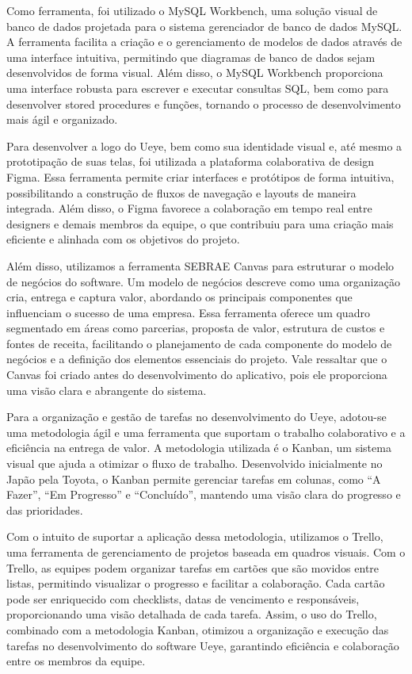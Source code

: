 Como ferramenta, foi utilizado o MySQL Workbench, uma solução visual de banco de dados projetada para o sistema gerenciador de banco de dados MySQL. A ferramenta facilita a criação e o gerenciamento de modelos de dados através de uma interface intuitiva, permitindo que diagramas de banco de dados sejam desenvolvidos de forma visual. Além disso, o MySQL Workbench proporciona uma interface robusta para escrever e executar consultas SQL, bem como para desenvolver stored procedures e funções, tornando o processo de desenvolvimento mais ágil e organizado. \textcite{DNC}

Para desenvolver a logo do Ueye, bem como sua identidade visual e, até mesmo a prototipação de suas telas, foi utilizada a plataforma colaborativa de design Figma. Essa ferramenta permite criar interfaces e protótipos de forma intuitiva, possibilitando a construção de fluxos de navegação e layouts de maneira integrada. Além disso, o Figma favorece a colaboração em tempo real entre designers e demais membros da equipe, o que contribuiu para uma criação mais eficiente e alinhada com os objetivos do projeto.  \textcite{Alura}

Além disso, utilizamos a ferramenta SEBRAE Canvas para estruturar o modelo de negócios do software. Um modelo de negócios descreve como uma organização cria, entrega e captura valor, abordando os principais componentes que influenciam o sucesso de uma empresa. Essa ferramenta oferece um quadro segmentado em áreas como parcerias, proposta de valor, estrutura de custos e fontes de receita, facilitando o planejamento de cada componente do modelo de negócios e a definição dos elementos essenciais do projeto. Vale ressaltar que o Canvas foi criado antes do desenvolvimento do aplicativo, pois ele proporciona uma visão clara e abrangente do sistema.

Para a organização e gestão de tarefas no desenvolvimento do Ueye, adotou-se uma metodologia ágil e uma ferramenta que suportam o trabalho colaborativo e a eficiência na entrega de valor. A metodologia utilizada é o Kanban, um sistema visual que ajuda a otimizar o fluxo de trabalho. Desenvolvido inicialmente no Japão pela Toyota, o Kanban permite gerenciar tarefas em colunas, como “A Fazer”, “Em Progresso” e “Concluído”, mantendo uma visão clara do progresso e das prioridades. \textcite{TOTVS}

Com o intuito de suportar a aplicação dessa metodologia, utilizamos o Trello, uma ferramenta de gerenciamento de projetos baseada em quadros visuais. Com o Trello, as equipes podem organizar tarefas em cartões que são movidos entre listas, permitindo visualizar o progresso e facilitar a colaboração. Cada cartão pode ser enriquecido com checklists, datas de vencimento e responsáveis, proporcionando uma visão detalhada de cada tarefa. Assim, o uso do Trello, combinado com a metodologia Kanban, otimizou a organização e execução das tarefas no desenvolvimento do software Ueye, garantindo eficiência e colaboração entre os membros da equipe. \textcite{Magalhães}